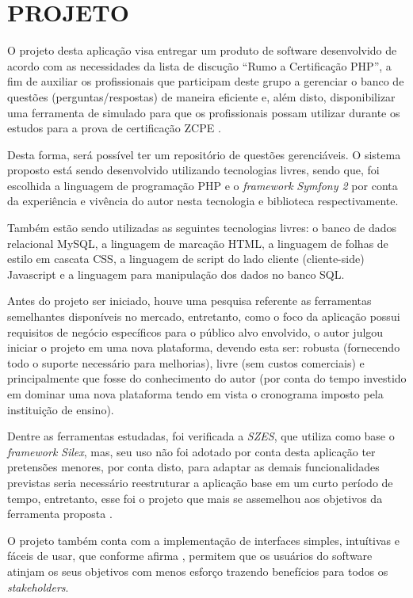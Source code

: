 \chapter{PROJETO}
\label{chp:projeto}
 
O projeto desta aplicação visa entregar um produto de software
desenvolvido de acordo com as necessidades da lista de discução ``Rumo a
Certificação PHP'', a fim de auxiliar os profissionais que participam deste
grupo a gerenciar o banco de questões (perguntas/respostas) de maneira eficiente e,
além disto, disponibilizar uma ferramenta de simulado para que os profissionais 
possam utilizar durante os estudos para a prova de certificação \acs{ZCPE}
\cite{googleGroupsRumoACertificaoPHP}.

Desta forma, será possível ter um repositório de questões gerenciáveis. O
sistema proposto está sendo desenvolvido utilizando tecnologias livres, sendo 
que, foi escolhida a linguagem de programação \acs{PHP} e o
\textit{framework} \textit{Symfony 2} por conta da experiência e vivência do
autor nesta tecnologia e biblioteca respectivamente.

Também estão sendo utilizadas as seguintes tecnologias livres: o banco de dados
relacional MySQL, a linguagem de marcação HTML, a linguagem de folhas de estilo 
em cascata CSS,  a linguagem de script do lado cliente (cliente-side) Javascript 
e a linguagem para manipulação dos dados no banco SQL.

Antes do projeto ser iniciado, houve uma pesquisa referente as ferramentas
semelhantes disponíveis no mercado, entretanto, como o foco da aplicação possui
requisitos de negócio específicos para o público alvo envolvido, o autor julgou
iniciar o projeto em uma nova plataforma, devendo esta ser: robusta (fornecendo
todo o suporte necessário para melhorias), livre (sem custos comerciais) e
principalmente que fosse do conhecimento do autor (por conta do tempo investido
em dominar uma nova plataforma tendo em vista o cronograma imposto pela
instituição de ensino).

Dentre as ferramentas estudadas, foi
verificada a \textit{SZES}, que utiliza como base o \textit{framework}
\textit{Silex}, mas, seu uso não foi adotado por conta desta aplicação
ter pretensões menores, por conta disto, para adaptar as demais funcionalidades
previstas seria necessário reestruturar a aplicação
base em um curto período de tempo, entretanto, esse foi o projeto que mais se
assemelhou aos objetivos da ferramenta proposta \cite{githubSZES}.

O projeto também conta com a implementação de interfaces simples, intuítivas e
fáceis de usar, que conforme afirma , permitem
que os usuários do software atinjam os seus objetivos com menos esforço trazendo
benefícios para todos os \textit{stakeholders}.


